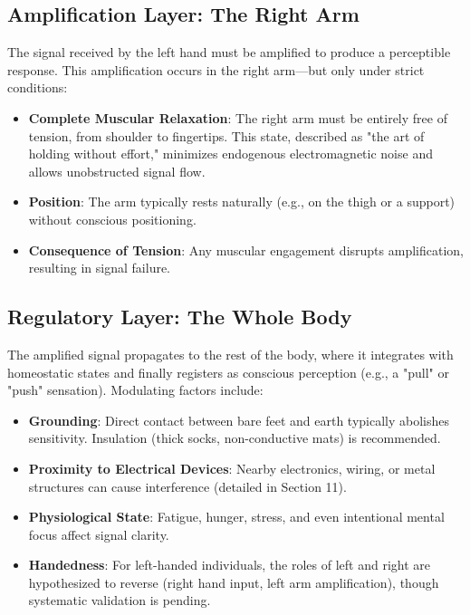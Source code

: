 \documentclass[12pt,a4paper]{article}
\begin{document}
\subsection{Amplification Layer: The Right Arm}

The signal received by the left hand must be amplified to produce a perceptible response. This amplification occurs in the right arm—but only under strict conditions:

\begin{itemize}
    \item \textbf{Complete Muscular Relaxation}: The right arm must be entirely free of tension, from shoulder to fingertips. This state, described as "the art of holding without effort," minimizes endogenous electromagnetic noise and allows unobstructed signal flow.
    \item \textbf{Position}: The arm typically rests naturally (e.g., on the thigh or a support) without conscious positioning.
    \item \textbf{Consequence of Tension}: Any muscular engagement disrupts amplification, resulting in signal failure.
\end{itemize}

\subsection{Regulatory Layer: The Whole Body}

The amplified signal propagates to the rest of the body, where it integrates with homeostatic states and finally registers as conscious perception (e.g., a "pull" or "push" sensation). Modulating factors include:

\begin{itemize}
    \item \textbf{Grounding}: Direct contact between bare feet and earth typically abolishes sensitivity. Insulation (thick socks, non-conductive mats) is recommended.
    \item \textbf{Proximity to Electrical Devices}: Nearby electronics, wiring, or metal structures can cause interference (detailed in Section 11).
    \item \textbf{Physiological State}: Fatigue, hunger, stress, and even intentional mental focus affect signal clarity.
    \item \textbf{Handedness}: For left-handed individuals, the roles of left and right are hypothesized to reverse (right hand input, left arm amplification), though systematic validation is pending.
\end{itemize}
\end{document}
